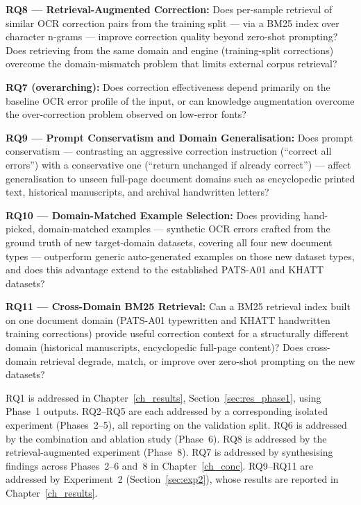 \textbf{RQ8 --- Retrieval-Augmented Correction:} Does per-sample retrieval
of similar OCR correction pairs from the training split --- via a BM25 index
over character n-grams --- improve correction quality beyond zero-shot
prompting? Does retrieving from the same domain and engine (training-split
corrections) overcome the domain-mismatch problem that limits external corpus
retrieval?

\textbf{RQ7 (overarching):} Does correction effectiveness depend primarily
on the baseline OCR error profile of the input, or can knowledge augmentation
overcome the over-correction problem observed on low-error fonts?

\textbf{RQ9 --- Prompt Conservatism and Domain Generalisation:} Does prompt
conservatism --- contrasting an aggressive correction instruction (``correct
all errors'') with a conservative one (``return unchanged if already correct'')
--- affect generalisation to unseen full-page document domains such as
encyclopedic printed text, historical manuscripts, and archival handwritten
letters?

\textbf{RQ10 --- Domain-Matched Example Selection:} Does providing
hand-picked, domain-matched examples --- synthetic OCR errors crafted from
the ground truth of new target-domain datasets, covering all four new document
types --- outperform generic auto-generated examples on those new dataset
types, and does this advantage extend to the established PATS-A01 and KHATT
datasets?

\textbf{RQ11 --- Cross-Domain BM25 Retrieval:} Can a BM25 retrieval index
built on one document domain (PATS-A01 typewritten and KHATT handwritten
training corrections) provide useful correction context for a structurally
different domain (historical manuscripts, encyclopedic full-page content)?
Does cross-domain retrieval degrade, match, or improve over zero-shot
prompting on the new datasets?

RQ1 is addressed in Chapter~\ref{ch_results}, Section~\ref{sec:res_phase1},
using Phase~1 outputs. RQ2--RQ5 are each addressed by a corresponding
isolated experiment (Phases~2--5), all reporting on the validation split.
RQ6 is addressed by the combination and ablation study (Phase~6). RQ8 is
addressed by the retrieval-augmented experiment (Phase~8). RQ7 is
addressed by synthesising findings across Phases~2--6 and~8 in
Chapter~\ref{ch_conc}. RQ9--RQ11 are addressed by Experiment~2
(Section~\ref{sec:exp2}), whose results are reported in
Chapter~\ref{ch_results}.

